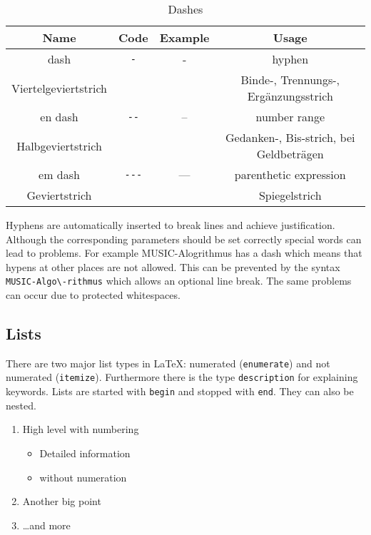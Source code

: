 \begin{table}[H]
	\centering
	\caption{Dashes}
	\label{tab:dashes}
	\begin{tabular}{cccc}
		\toprule
		Name & Code & Example & Usage\\
		\midrule
		dash & \verb|-| & - & hyphen\\
		Viertelgeviertstrich & &  & Binde-, Trennungs-, Ergänzungsstrich\\
		en dash & \verb|--| & -- & number range\\
		Halbgeviertstrich & & & Gedanken-, Bis-strich, bei Geldbeträgen\\
		em dash & \verb|---| & --- & parenthetic expression \\
		Geviertstrich &  & & Spiegelstrich\\
		\bottomrule
	\end{tabular}
\end{table}

Hyphens are automatically inserted to break lines and achieve justification. Although the corresponding parameters should be set correctly special words can lead to problems. For example MUSIC-Alogrithmus has a dash which means that hypens at other places are not allowed. This can be prevented by the syntax \hbox{\verb|MUSIC-Algo\-rithmus|} which allows an optional line break. The same problems can occur due to protected whitespaces.

\subsection{Lists}

There are two major list types in {\LaTeX}: numerated (\texttt{enumerate}) and not numerated (\texttt{itemize}). Furthermore there is the type \texttt{description} for explaining keywords. Lists are started with \texttt{begin} and stopped with \texttt{end}. They can also be nested.

\begin{enumerate}
	\item High level with numbering
	\begin{itemize}
		\item Detailed information
		\item without numeration
	\end{itemize}
	\item Another big point
	\item \dots and more
\end{enumerate}

